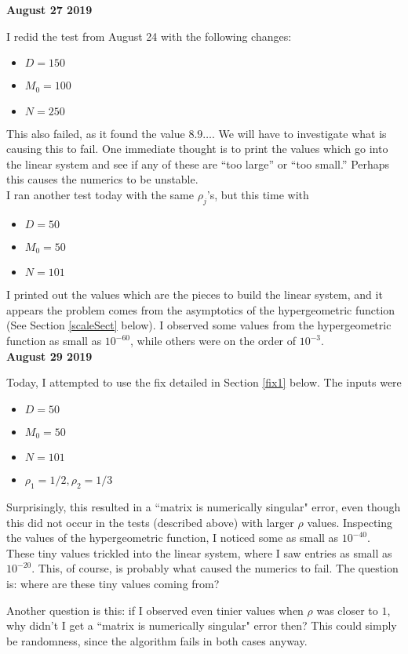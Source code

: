 \documentclass[]{article}
\begin{document}
\noindent \textbf{August 27 2019}

I redid the test from August 24 with the following changes:
\begin{itemize}
	\item $D = 150$
	\item $M_0 = 100$
	\item $N = 250$
\end{itemize}
This also failed, as it found the value $8.9\dots$.
We will have to investigate what is causing this to fail.
One immediate thought is to print the values which go into the linear system and see if any of these are ``too large'' or ``too small.''
Perhaps this causes the numerics to be unstable.
\\

I ran another test today with the same $\rho_j$'s, but this time with
\begin{itemize}
	\item $D = 50$
	\item $M_0 = 50$
	\item $N = 101$
\end{itemize}
I printed out the values which are the pieces to build the linear system, and it appears the problem comes from the asymptotics of the hypergeometric function (See Section \ref{scaleSect} below).
I observed some values from the hypergeometric function as small as $10^{-60}$, while others were on the order of $10^{-3}$.
\\

\noindent \textbf{August 29 2019}

Today, I attempted to use the fix detailed in Section \ref{fix1} below.
The inputs were
\begin{itemize}
	\item $D = 50$
	\item $M_0 = 50$
	\item $N = 101$
	\item $\rho_1 = 1/2, \rho_2 = 1/3$
\end{itemize}
Surprisingly, this resulted in a ``matrix is numerically singular" error, even though this did not occur in the tests (described above) with larger $\rho$ values.
Inspecting the values of the hypergeometric function, I noticed some as small as $10^{-40}$.
These tiny values trickled into the linear system, where I saw entries as small as $10^{-20}$.
This, of course, is probably what caused the numerics to fail.
The question is: where are these tiny values coming from?

Another question is this: if I observed even tinier values when $\rho$ was closer to $1$, why didn't I get a ``matrix is numerically singular" error then?
This could simply be randomness, since the algorithm fails in both cases anyway.
\\
\end{document}
